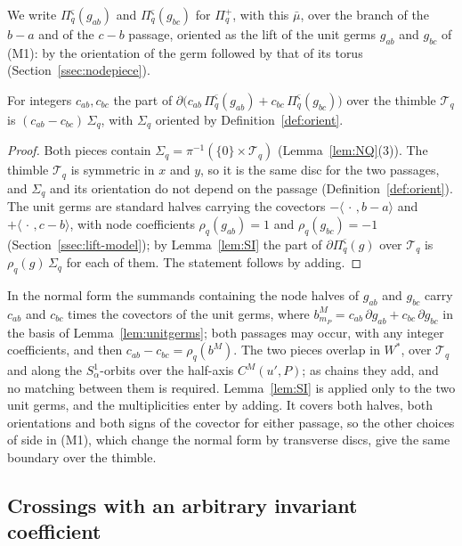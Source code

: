 We write $\Pi^\varsigma_q(g_{ab})$ and $\Pi^\varsigma_q(g_{bc})$ for $\Pi^+_q$, with this $\bar\mu$, over the branch of the
$b-a$ and of the $c-b$ passage, oriented as the lift of the unit germs $g_{ab}$ and $g_{bc}$ of (M1): by the orientation of
the germ followed by that of its torus (Section~\ref{ssec:nodepiece}).

\begin{lemma}\label{lem:nodesum}
For integers $c_{ab},c_{bc}$ the part of $\partial\bigl(c_{ab}\,\Pi^\varsigma_q(g_{ab})+c_{bc}\,\Pi^\varsigma_q(g_{bc})\bigr)$
over the thimble $\mathscr T_q$ is $(c_{ab}-c_{bc})\,\Sigma_q$, with $\Sigma_q$ oriented by Definition~\ref{def:orient}.
\end{lemma}

\begin{proof}
Both pieces contain $\Sigma_q=\pi^{-1}(\{0\}\times\mathscr T_q)$ (Lemma~\ref{lem:NQ}(3)). The thimble $\mathscr T_q$ is
symmetric in $x$ and $y$, so it is the same disc for the two passages, and $\Sigma_q$ and its orientation do not depend on
the passage (Definition~\ref{def:orient}). The unit germs are standard halves carrying the covectors
$-\langle\,\cdot\,,b-a\rangle$ and $+\langle\,\cdot\,,c-b\rangle$, with node coefficients $\rho_q(g_{ab})=1$ and
$\rho_q(g_{bc})=-1$ (Section~\ref{ssec:lift-model}); by Lemma~\ref{lem:SI} the part of $\partial\Pi^\varsigma_q(g)$ over
$\mathscr T_q$ is $\rho_q(g)\,\Sigma_q$ for each of them. The statement follows by adding.
\end{proof}

In the normal form the summands containing the node halves of $g_{ab}$ and $g_{bc}$ carry $c_{ab}$ and $c_{bc}$ times
the covectors of the unit germs, where $b^M_{m_P}=c_{ab}\,\partial g_{ab}+c_{bc}\,\partial g_{bc}$ in the basis of
Lemma~\ref{lem:unitgerms}; both passages may occur, with any integer coefficients, and then $c_{ab}-c_{bc}=\rho_q(b^M)$.
The two pieces overlap in $W^*$, over $\mathscr T_q$ and along the $S^1_\alpha$-orbits over the half-axis $C^M(u',P)$; as
chains they add, and no matching between them is required. Lemma~\ref{lem:SI} is applied only to the two unit germs, and
the multiplicities enter by adding. It covers both halves, both orientations and both signs of the covector for either
passage, so the other choices of side in (M1), which change the normal form by transverse discs, give the same boundary
over the thimble.

\subsection{Crossings with an arbitrary invariant coefficient}\label{ssec:lift-cross}

